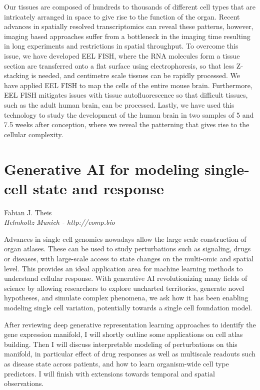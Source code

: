\noindent
Our tissues are composed of hundreds to thousands of different cell types that are intricately arranged in space to give rise to the function of the organ. Recent advances in spatially resolved transcriptomics can reveal these patterns, however, imaging based approaches suffer from a bottleneck in the imaging time resulting in long experiments and restrictions in spatial throughput. To overcome this issue, we have developed EEL FISH, where the RNA molecules form a tissue section are transferred onto a flat surface using electrophoresis, so that less Z-stacking is needed, and centimetre scale tissues can be rapidly processed. We have applied EEL FISH to map the cells of the entire mouse brain. Furthermore, EEL FISH mitigates issues with tissue autofluorescence so that difficult tissues, such as the adult human brain, can be processed. Lastly, we have used this technology to study the development of the human brain in two samples of 5 and 7.5 weeks after conception, where we reveal the patterning that gives rise to the cellular complexity.
\newpage

\section*{Generative AI for modeling single-cell state and response}

\begin{center}
Fabian J. Theis \\
\vspace{0.2cm}
\textit{Helmholtz Munich - http://comp.bio}
\end{center}

\noindent
Advances in single cell genomics nowadays allow the large scale construction of organ atlases. These can be used to study perturbations such as signaling, drugs or diseases, with large-scale access to state changes on the multi-omic and spatial level. This provides an ideal application area for machine learning methods to understand cellular response. With generative AI revolutionizing many fields of science by allowing researchers to explore uncharted territories, generate novel hypotheses, and simulate complex phenomena, we ask how it has been enabling modeling single cell variation, potentially towards a single cell foundation model.
 
After reviewing deep generative representation learning approaches to identify the gene expression manifold, I will shortly outline some applications on cell atlas building. Then I will discuss interpretable modeling of perturbations on this manifold, in particular effect of drug responses as well as multiscale readouts such as disease state across patients, and how to learn organism-wide cell type predictors. I will finish with extensions towards temporal and spatial observations.
\newpage

